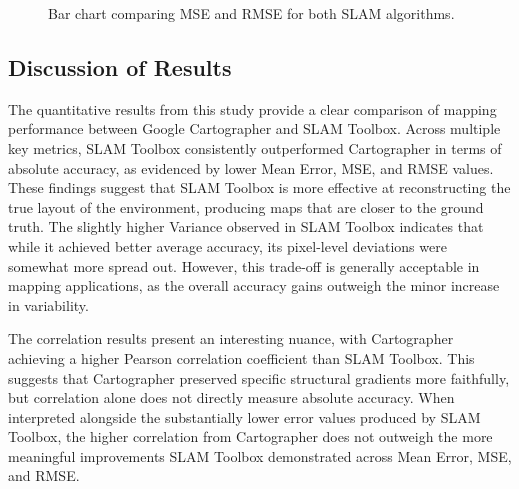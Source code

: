 \documentclass[runningheads,11pt]{llncs_bigfont_absbib}
\begin{document}
\begin{figure}[h!]
\centering
{}
\caption{Bar chart comparing MSE and RMSE for both SLAM algorithms.}
\end{figure}

\subsection{Discussion of Results}
The quantitative results from this study provide a clear comparison of mapping performance between Google Cartographer and SLAM Toolbox. Across multiple key metrics, SLAM Toolbox consistently outperformed Cartographer in terms of absolute accuracy, as evidenced by lower Mean Error, MSE, and RMSE values. These findings suggest that SLAM Toolbox is more effective at reconstructing the true layout of the environment, producing maps that are closer to the ground truth.
The slightly higher Variance observed in SLAM Toolbox indicates that while it achieved better average accuracy, its pixel-level deviations were somewhat more spread out. However, this trade-off is generally acceptable in mapping applications, as the overall accuracy gains outweigh the minor increase in variability.

The correlation results present an interesting nuance, with Cartographer achieving a higher Pearson correlation coefficient than SLAM Toolbox. This suggests that Cartographer preserved specific structural gradients more faithfully, but correlation alone does not directly measure absolute accuracy. When interpreted alongside the substantially lower error values produced by SLAM Toolbox, the higher correlation from Cartographer does not outweigh the more meaningful improvements SLAM Toolbox demonstrated across Mean Error, MSE, and RMSE.
\end{document}
